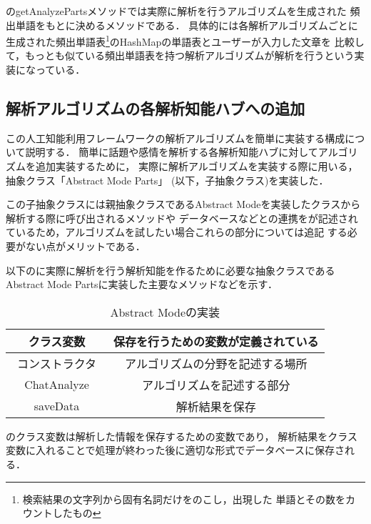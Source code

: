 のgetAnalyzePartsメソッドでは実際に解析を行うアルゴリズムを生成された
頻出単語をもとに決めるメソッドである．
具体的には各解析アルゴリズムごとに生成された頻出単語表\footnote{検索結果の文字列から固有名詞だけをのこし，出現した
単語とその数をカウントしたもの}のHashMapの単語表とユーザーが入力した文章を
比較して，もっとも似ている頻出単語表を持つ解析アルゴリズムが解析を行うという実装になっている．





\subsection{解析アルゴリズムの各解析知能ハブへの追加}
この人工知能利用フレームワークの解析アルゴリズムを簡単に実装する構成について説明する．
簡単に話題や感情を解析する各解析知能ハブに対してアルゴリズムを追加実装するために，
実際に解析アルゴリズムを実装する際に用いる，抽象クラス「Abstract Mode Parts」
(以下，子抽象クラス)を実装した．

この子抽象クラスには親抽象クラスであるAbstract Modeを実装したクラスから解析する際に呼び出されるメソッドや
データベースなどとの連携をが記述されているため，アルゴリズムを試したい場合これらの部分については追記
する必要がない点がメリットである．

以下のに実際に解析を行う解析知能を作るために必要な抽象クラスである
Abstract Mode Partsに実装した主要なメソッドなどを示す．
\begin{table}[tbh]
	\caption{Abstract Modeの実装} \label{tab:Abstract Mode Parts}
	\begin{center}
		\begin{tabular}[htb]{c|c}
		\hline
		クラス変数 & 保存を行うための変数が定義されている \\ \hline
		コンストラクタ　& アルゴリズムの分野を記述する場所 \\ \hline
		ChatAnalyze & アルゴリズムを記述する部分 \\ \hline
		saveData & 解析結果を保存 \\ \hline
		\end{tabular}
	\end{center}
\end{table}

のクラス変数は解析した情報を保存するための変数であり，
解析結果をクラス変数に入れることで処理が終わった後に適切な形式でデータベースに保存される．

